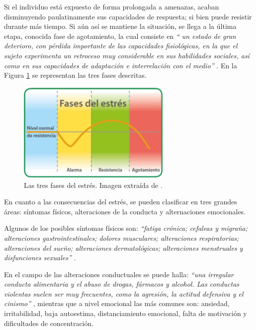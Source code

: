         Si el individuo está expuesto de forma prolongada a amenazas, acaban disminuyendo paulatinamente sus capacidades de respuesta; si bien puede resistir durante más tiempo. Si aún así se mantiene la situación, se llega a la última etapa, conocida fase de agotamiento, la cual consiste en \textit{`` un estado de gran deterioro, con pérdida importante de las capacidades fisiológicas, en la que el sujeto experimenta un retroceso muy considerable en sus habilidades sociales, así como en sus capacidades de adaptación e interrelación con el medio''} \cite{torrades_estres_2007}. En la Figura \ref{figure:marco_teorico:fases_estres} se representan las tres fases descritas.

        \begin{figure}[h]
            \centering
            \includegraphics[width=0.66\textwidth]{figures/fases estres.JPG}
            \caption[Las tres fases del estrés]
            {Las tres fases del estrés. Imagen extraída de \cite{currid_efectos_2019}.}
            \label{figure:marco_teorico:fases_estres}
        \end{figure}

        En cuanto a las consecuencias del estrés, se pueden clasificar en tres grandes áreas: síntomas físicos, alteraciones de la conducta y alternaciones emocionales.

        Algunos de los posibles síntomas físicos son: \textit{``fatiga crónica; cefaleas y migraña; alteraciones gastrointestinales; dolores musculares; alteraciones respiratorias; alteraciones del sueño; alteraciones dermatológicas; alteraciones menstruales y disfunciones sexuales''} \cite{torrades_estres_2007}.

        En el campo de las alteraciones conductuales se puede halla: \textit{``una irregular conducta alimentaria y el abuso de drogas, fármacos y alcohol. Las conductas violentas suelen ser muy frecuentes, como la agresión, la actitud defensiva y el cinismo''} \cite{torrades_estres_2007}, mientras que a nivel emocional las más comunes son: ansiedad, irritabilidad, baja autoestima, distanciamiento emocional, falta de motivación y dificultades de concentración.

